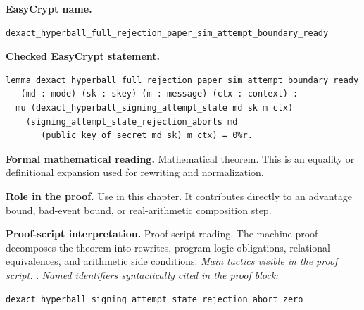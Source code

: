 \begin{formaltheorem}
\noindent\textbf{EasyCrypt name.}
\begin{lstlisting}[language=EasyCrypt,basicstyle=\ttfamily\scriptsize]
dexact_hyperball_full_rejection_paper_sim_attempt_boundary_ready
\end{lstlisting}
\noindent\textbf{Checked EasyCrypt statement.}
\begin{lstlisting}[language=EasyCrypt,basicstyle=\ttfamily\scriptsize]
lemma dexact_hyperball_full_rejection_paper_sim_attempt_boundary_ready
   (md : mode) (sk : skey) (m : message) (ctx : context) :
  mu (dexact_hyperball_signing_attempt_state md sk m ctx)
    (signing_attempt_state_rejection_aborts md
       (public_key_of_secret md sk) m ctx) = 0%r.
\end{lstlisting}
\noindent\textbf{Formal mathematical reading.}
Mathematical theorem. This is an equality or definitional expansion used for rewriting and normalization.

\noindent\textbf{Role in the proof.}
Use in this chapter. It contributes directly to an advantage bound, bad-event bound, or real-arithmetic composition step.

\noindent\textbf{Proof-script interpretation.}
Proof-script reading. The machine proof decomposes the theorem into rewrites, program-logic obligations, relational equivalences, and arithmetic side conditions.
\emph{Main tactics visible in the proof script:} .
\emph{Named identifiers syntactically cited in the proof block:}
\begin{lstlisting}[language=EasyCrypt,basicstyle=\ttfamily\scriptsize]
dexact_hyperball_signing_attempt_state_rejection_abort_zero
\end{lstlisting}

\end{formaltheorem}

